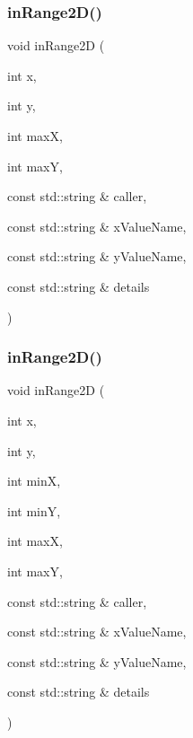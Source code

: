 \subsubsection{\texorpdfstring{in\+Range2\+D()}{inRange2D()}\hspace{0.1cm}{\footnotesize\ttfamily [3/4]}}
{\footnotesize\ttfamily void in\+Range2D (\begin{DoxyParamCaption}\item[{int}]{x,  }\item[{int}]{y,  }\item[{int}]{maxX,  }\item[{int}]{maxY,  }\item[{const std\+::string \&}]{caller,  }\item[{const std\+::string \&}]{x\+Value\+Name,  }\item[{const std\+::string \&}]{y\+Value\+Name,  }\item[{const std\+::string \&}]{details }\end{DoxyParamCaption})}

\mbox{\label{namespacerequire_ade06d050472e11a6b11e4076493d5a3a}} 
\subsubsection{\texorpdfstring{in\+Range2\+D()}{inRange2D()}\hspace{0.1cm}{\footnotesize\ttfamily [4/4]}}
{\footnotesize\ttfamily void in\+Range2D (\begin{DoxyParamCaption}\item[{int}]{x,  }\item[{int}]{y,  }\item[{int}]{minX,  }\item[{int}]{minY,  }\item[{int}]{maxX,  }\item[{int}]{maxY,  }\item[{const std\+::string \&}]{caller,  }\item[{const std\+::string \&}]{x\+Value\+Name,  }\item[{const std\+::string \&}]{y\+Value\+Name,  }\item[{const std\+::string \&}]{details }\end{DoxyParamCaption})}

\mbox{\label{namespacerequire_a9e6bb70ad494e8078ce303b10c3c758f}} 

